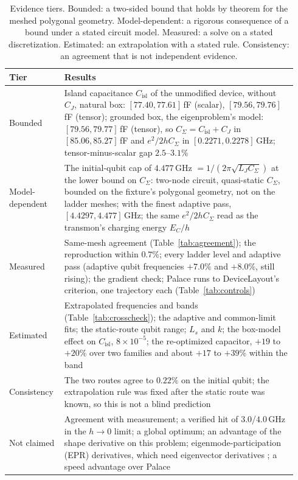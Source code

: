 \documentclass{anvil-paper}
\newcommand{\Cisl}{C_{\mathrm{isl}}}
\begin{document}
\begin{table}[htbp]
  \centering
  \caption{Evidence tiers. Bounded: a two-sided bound that holds by theorem
  for the meshed polygonal geometry. Model-dependent: a rigorous consequence of a
  bound under a stated circuit model. Measured: a solve on a stated
  discretization. Estimated: an extrapolation with a stated rule.
  Consistency: an agreement that is not independent evidence.}
  \label{tab:tiers}
  \footnotesize
  \begin{tabular}{@{}>{\raggedright\arraybackslash}p{0.17\linewidth}>{\raggedright\arraybackslash}p{0.77\linewidth}@{}}
    \toprule
    Tier & Results \\
    \midrule
    Bounded & Island capacitance $\Cisl$ of the unmodified device, without $C_J$, natural box: $[77.40, 77.61]$\,fF (scalar), $[79.56, 79.76]$\,fF (tensor); grounded box, the eigenproblem's model: $[79.56, 79.77]$\,fF (tensor), so $C_\Sigma = \Cisl + C_J$ in $[85.06, 85.27]$\,fF and $e^2/2hC_\Sigma$ in $[0.2271, 0.2278]$\,GHz; tensor-minus-scalar gap $2.5$--$3.1\%$ \\
    Model-dependent & The initial-qubit cap of $4.477$\,GHz $= 1/(2\pi\sqrt{L_J C_\Sigma})$ at the lower bound on $C_\Sigma$: two-node circuit, quasi-static $C_\Sigma$, bounded on the fixture's polygonal geometry, not on the ladder meshes; with the finest adaptive pass, $[4.4297, 4.477]$\,GHz; the same $e^2/2hC_\Sigma$ read as the transmon's charging energy $E_C/h$ \\
    Measured & Same-mesh agreement (Table~\ref{tab:agreement}); the reproduction within $0.7\%$; every ladder level and adaptive pass (adaptive qubit frequencies $+7.0\%$ and $+8.0\%$, still rising); the gradient check; Palace runs to DeviceLayout's criterion, one trajectory each (Table~\ref{tab:controls}) \\
    Estimated & Extrapolated frequencies and bands (Table~\ref{tab:crosscheck}); the adaptive and common-limit fits; the static-route qubit range; $L_s$ and $k$; the box-model effect on $\Cisl$, $8\times10^{-5}$; the re-optimized capacitor, $+19$ to $+20\%$ over two families and about $+17$ to $+39\%$ within the band \\
    Consistency & The two routes agree to $0.22\%$ on the initial qubit; the extrapolation rule was fixed after the static route was known, so this is not a blind prediction \\
    Not claimed & Agreement with measurement; a verified hit of $3.0$/$4.0$\,GHz in the $h \to 0$ limit; a global optimum; an advantage of the shape derivative on this problem; eigenmode-participation (EPR) derivatives, which need eigenvector derivatives \citep{nelson1976simplified}; a speed advantage over Palace \\
    \bottomrule
  \end{tabular}
\end{table}
\end{document}
